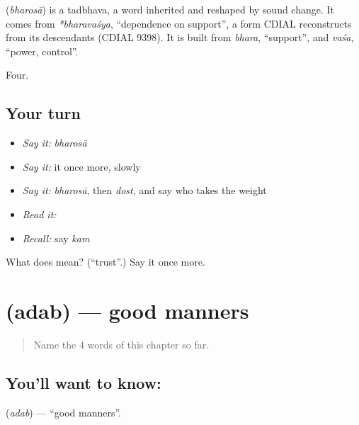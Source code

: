\begin{cousinweb}
\textbf{} (\emph{bharosā}) is a tadbhava, a word inherited and reshaped by sound change. It comes from \emph{*bharavaśya}, \textquotedblleft{}dependence on support\textquotedblright{}, a form CDIAL reconstructs from its descendants (CDIAL 9398). It is built from \emph{bhara}, \textquotedblleft{}support\textquotedblright{}, and \emph{vaśa}, \textquotedblleft{}power, control\textquotedblright{}.
\end{cousinweb}

\begin{grammarlens}[title={What you've built}]
Four.
\end{grammarlens}

\subsection*{Your turn}
\begin{itemize}
\raggedright
  \item \emph{Say it:} \emph{bharosā}
  \item \emph{Say it:} it once more, slowly
  \item \emph{Say it:} \emph{bharosā}, then \emph{dost}, and say who takes the weight
  \item \emph{Read it:} \textbf{}
  \item \emph{Recall:} say \emph{kam}
\end{itemize}

\begin{tcolorbox}[breakable,colback=teal!4,colframe=teal!35!black,title={Before you move on}]
What does  mean? (\textquotedblleft{}trust\textquotedblright{}.) Say it once more.
\end{tcolorbox}
\section[\texorpdfstring{\hi{अदब} (adab)}{अदब (adab)}]{ (adab) — good manners}

\label{lesson:HI-C65-manners}



\begin{quote}
Name the 4 words of this chapter so far.
\end{quote}

\subsection*{You'll want to know: }
\textbf{} (\emph{adab}) — \textquotedblleft{}good manners\textquotedblright{}.

